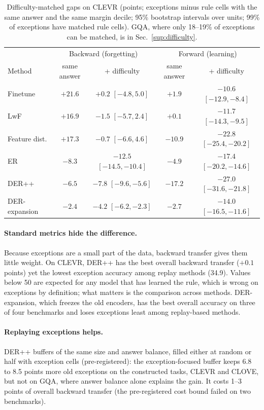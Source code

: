 \begin{table}[t]
\centering\small\setlength{\tabcolsep}{3pt}
\caption{Difficulty-matched gaps on CLEVR (points; exceptions minus rule cells with the same answer and the same
margin decile; 95\% bootstrap intervals over units; 99\% of exceptions have matched rule cells). GQA, where only
18--19\% of exceptions can be matched, is in Sec.~\ref{sup:difficulty}.}
\label{tab:difficulty}
\begin{tabular}{lcccc}
\toprule
 & \multicolumn{2}{c}{Backward (forgetting)} & \multicolumn{2}{c}{Forward (learning)} \\
Method & same answer & + difficulty & same answer & + difficulty \\
\midrule
Finetune      & $+21.6$ & $+0.2$ $[-4.8,5.0]$   & $+1.9$  & $-10.6$ $[-12.9,-8.4]$ \\
LwF           & $+16.9$ & $-1.5$ $[-5.7,2.4]$   & $+0.1$  & $-11.7$ $[-14.3,-9.5]$ \\
Feature dist. & $+17.3$ & $-0.7$ $[-6.6,4.6]$   & $-10.9$ & $-22.8$ $[-25.4,-20.2]$ \\
ER            & $-8.3$  & $-12.5$ $[-14.5,-10.4]$ & $-4.9$ & $-17.4$ $[-20.2,-14.6]$ \\
DER++         & $-6.5$  & $-7.8$ $[-9.6,-5.6]$  & $-17.2$ & $-27.0$ $[-31.6,-21.8]$ \\
DER-expansion & $-2.4$  & $-4.2$ $[-6.2,-2.3]$  & $-2.7$  & $-14.0$ $[-16.5,-11.6]$ \\
\bottomrule
\end{tabular}
\end{table}

\paragraph{Standard metrics hide the difference.}
Because exceptions are a small part of the data, backward transfer gives them little weight. On CLEVR, DER++ has the
best overall backward transfer ($+0.1$ points) yet the lowest exception accuracy among replay methods (34.9). Values
below 50 are expected for any model that has learned the rule, which is wrong on exceptions by definition; what matters
is the comparison across methods. DER-expansion, which freezes the old encoders, has the best overall accuracy on three
of four benchmarks and loses exceptions least among replay-based methods.

\paragraph{Replaying exceptions helps.}
DER++ buffers of the same size and answer balance, filled either at random or half with exception cells
(pre-registered): the exception-focused buffer keeps 6.8 to 8.5 points more old exceptions on the constructed tasks,
CLEVR and CLOVE, but not on GQA, where answer balance alone explains the gain. It costs 1--3 points of overall backward
transfer (the pre-registered cost bound failed on two benchmarks).

